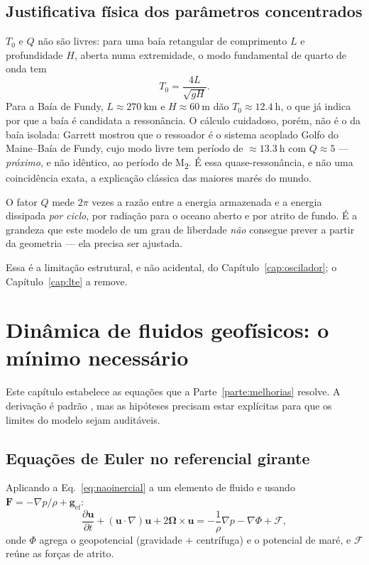 \documentclass[11pt,a4paper,oneside]{report}
\theoremstyle{definition}
\theoremstyle{plain}
\theoremstyle{remark}
\newcommand{\vect}[1]{\bm{#1}}
\newcommand{\pd}[2]{\frac{\partial #1}{\partial #2}}
\begin{document}
\section{Justificativa física dos parâmetros concentrados}

$T_0$ e $Q$ não são livres: para uma baía retangular de comprimento $L$ e
profundidade $H$, aberta numa extremidade, o modo fundamental de quarto de onda
tem
\begin{equation}
T_0=\frac{4L}{\sqrt{gH}}.
\label{eq:quartodeonda}
\end{equation}
Para a Baía de Fundy, $L\approx\SI{270}{\kilo\meter}$ e
$H\approx\SI{60}{\meter}$ dão $T_0\approx\SI{12.4}{\hour}$, o que já indica por
que a baía é candidata a ressonância. O cálculo cuidadoso, porém, não é o da
baía isolada: Garrett \cite{garrett1972} mostrou que o ressoador é o sistema
acoplado Golfo do Maine--Baía de Fundy, cujo modo livre tem período de
$\approx\SI{13.3}{\hour}$ com $Q\approx 5$ — \emph{próximo}, e não idêntico, ao
período de M\textsubscript{2}. É essa quase-ressonância, e não uma coincidência
exata, a explicação clássica das maiores marés do mundo.

O fator $Q$ mede $2\pi$ vezes a razão entre a energia armazenada e a energia
dissipada \emph{por ciclo}, por radiação para o oceano aberto e por atrito de
fundo. É a grandeza que este modelo de um grau de liberdade \emph{não} consegue
prever a partir da geometria — ela precisa ser ajustada.

Essa é a limitação estrutural, e não acidental, do
Capítulo~\ref{cap:oscilador}; o Capítulo~\ref{cap:lte} a remove.

\chapter{Dinâmica de fluidos geofísicos: o mínimo necessário}
\label{cap:fluidos}

Este capítulo estabelece as equações que a Parte~\ref{parte:melhorias} resolve.
A derivação é padrão \cite{gill1982,pedlosky1987}, mas as hipóteses precisam
estar explícitas para que os limites do modelo sejam auditáveis.

\section{Equações de Euler no referencial girante}

Aplicando a Eq.~\eqref{eq:naoinercial} a um elemento de fluido e usando
$\vect{F}=-\nabla p/\rho + \vect{g}_{\text{ef}}$:
\begin{equation}
\pd{\vect{u}}{t}+(\vect{u}\cdot\nabla)\vect{u}
+2\vect{\Omega}\times\vect{u}
=-\frac{1}{\rho}\nabla p-\nabla\Phi+\vect{\mathcal{F}},
\label{eq:euler}
\end{equation}
onde $\Phi$ agrega o geopotencial (gravidade $+$ centrífuga) e o potencial de
maré, e $\vect{\mathcal{F}}$ reúne as forças de atrito.
\end{document}
